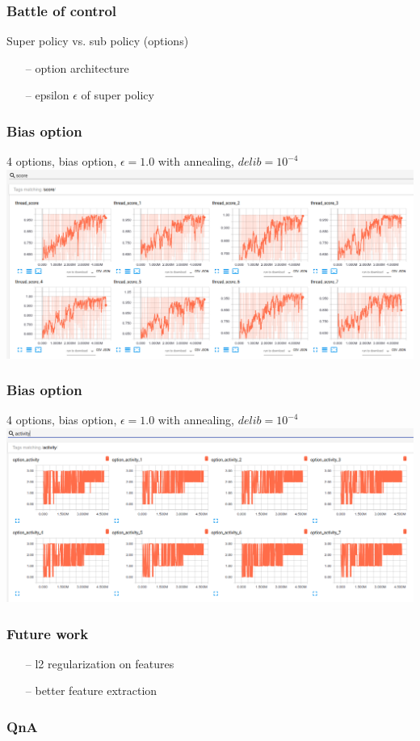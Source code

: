 \documentclass{beamer}
\begin{document}
\begin{frame}
\frametitle{Battle of control}
Super policy vs. sub policy (options)
\begin{itemize}
\item[--] option architecture
\item[--] epsilon $\epsilon$ of super policy
\end{itemize}
\end{frame}


\begin{frame}
\frametitle{Bias option}
4 options, bias option, $\epsilon = 1.0$ with annealing, $delib = 10^{-4}$
\includegraphics[scale=0.2]{./bias/score.png}
\end{frame}

\begin{frame}
\frametitle{Bias option}
4 options, bias option, $\epsilon = 1.0$ with annealing, $delib = 10^{-4}$
\includegraphics[scale=0.2]{./bias/activity.png}
\end{frame}


\begin{frame}
\frametitle{Future work}
\begin{itemize}
\item[--] l2 regularization on features
\item[--] better feature extraction
\end{itemize}
\end{frame}


\begin{frame}
\frametitle{QnA}
\end{frame}

%
\end{document}
